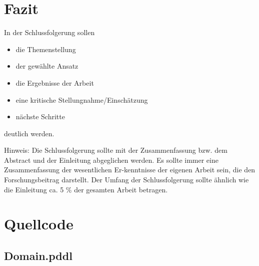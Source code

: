 \section{Fazit}
In der Schlussfolgerung sollen

\begin{itemize}
\item die Themenstellung
\item der gewählte Ansatz
\item die Ergebnisse der Arbeit
\item eine kritische Stellungnahme/Einschätzung
\item nächste Schritte
\end{itemize}
deutlich werden.

Hinweis:
Die Schlussfolgerung sollte mit der Zusammenfassung bzw. dem Abstract und der Einleitung abgeglichen werden. Es sollte immer eine Zusammenfassung der wesentlichen Er-kenntnisse der eigenen Arbeit sein, die den Forschungsbeitrag darstellt. Der Umfang der Schlussfolgerung sollte ähnlich wie die Einleitung ca. 5 \% der gesamten Arbeit betragen.


\clearpage
\lhead{}
\printbibliography
{}


\clearpage
\appendix
\section{Quellcode} %
\subsection{Domain.pddl}






\clearemptydoublepage




